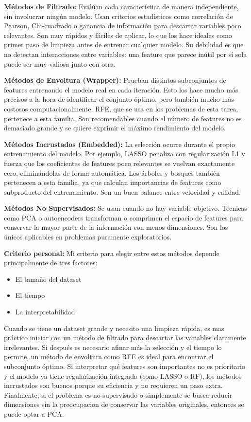 \documentclass{article}
\begin{document}
\textbf{Métodos de Filtrado:} Evalúan cada característica de manera independiente, sin involucrar ningún modelo. Usan criterios estadísticos como correlación de Pearson, Chi-cuadrado o ganancia de información para descartar variables poco relevantes. Son muy rápidos y fáciles de aplicar, lo que los hace ideales como primer paso de limpieza antes de entrenar cualquier modelo. Su debilidad es que no detectan interacciones entre variables: una feature que parece inútil por sí sola puede ser muy valiosa junto con otra.

\textbf{Métodos de Envoltura (Wrapper):} Prueban distintos subconjuntos de features entrenando el modelo real en cada iteración. Esto los hace mucho más precisos a la hora de identificar el conjunto óptimo, pero también mucho más costosos computacionalmente. RFE, que se usa en los problemas de esta tarea, pertenece a esta familia. Son recomendables cuando el número de features no es demasiado grande y se quiere exprimir el máximo rendimiento del modelo.

\textbf{Métodos Incrustados (Embedded):} La selección ocurre durante el propio entrenamiento del modelo. Por ejemplo, LASSO penaliza con regularización L1 y fuerza que los coeficientes de features poco relevantes se vuelvan exactamente cero, eliminándolas de forma automática. Los árboles y bosques también pertenecen a esta familia, ya que calculan importancias de features como subproducto del entrenamiento. Son un buen balance entre velocidad y calidad.

\textbf{Métodos No Supervisados:} Se usan cuando no hay variable objetivo. Técnicas como PCA o autoencoders transforman o comprimen el espacio de features para conservar la mayor parte de la información con menos dimensiones. Son los únicos aplicables en problemas puramente exploratorios.

\textbf{Criterio personal:} Mi criterio para elegir entre estos métodos depende principalmente de tres factores: 

\begin{itemize}
    \item El tamaño del dataset
    \item El tiempo 
    \item La interpretabilidad
\end{itemize}

Cuando se tiene un dataset grande y necesito una limpieza rápida, es mas práctico iniciar con un método de filtrado para descartar las variables claramente irrelevantes. Si después es necesario afinar más la selección y el tiempo lo permite, un método de envoltura como RFE es ideal para encontrar el subconjunto óptimo. Si interpretar qué features son importantes no es prioritario y el modelo ya tiene regularización integrada (como LASSO o RF), los métodos incrustados son buenos porque su eficiencia y no requieren un paso extra. Finalmente, si el problema es no supervisado o simplemente se busca reducir dimensiones sin la preocupacion de conservar las variables originales, entonces se puede optar a PCA.
\end{document}
